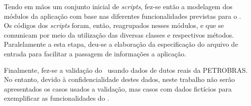 Tendo em mãos um conjunto inicial de \textit{scripts}, fez-se então a modelagem dos módulos da aplicação com base nas diferentes funcionalidades previstas para o \frame.
Os códigos dos \textit{scripts} foram, então, reagrupados nesses módulos, e que se comunicam por meio da utilização das diversas classes e respectivos métodos.
Paralelamente a esta etapa, deu-se a elaboração da especificação do arquivo de entrada para facilitar a passagem de informações a aplicação.

Finalmente, fez-se a validação do \frame\ usando dados de dutos reais da PETROBRAS\@.
No entanto, devido à confidencialidade destes dados, neste trabalho não serão apresentados os casos usados a validação, mas casos com dados fictícios para exemplificar as funcionalidades do \frame.